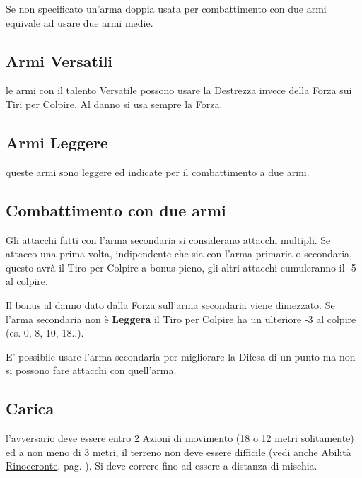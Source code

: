 \begin{multicols}{2}
Se non specificato un'arma doppia usata per combattimento con due armi equivale ad usare due armi medie.

\subsection{Armi Versatili} \label{armiversatili}

le armi con il talento Versatile possono usare la Destrezza invece della Forza sui Tiri per Colpire. Al danno si usa sempre la Forza.

\subsection{Armi Leggere} \label{armileggere}

queste armi sono leggere ed indicate per il \hyperlink{combattimentoaduemani}{combattimento a due armi}.



\subsection{Combattimento con due armi}\hypertarget{combattimentoaduemani}{}\label{combattimentoduemani}

Gli attacchi fatti con l'arma secondaria si considerano attacchi multipli.
Se attacco una prima volta, indipendente che sia con l'arma primaria o secondaria, questo avrà il Tiro per Colpire a bonus pieno, gli altri attacchi cumuleranno il -5 al colpire.

Il bonus al danno dato dalla Forza sull'arma secondaria viene dimezzato. Se l'arma secondaria non è \textbf{Leggera} il Tiro per Colpire ha un ulteriore -3 al colpire (es. 0,-8,-10,-18..).

E' possibile usare l'arma secondaria per migliorare la Difesa di un punto ma non si possono fare attacchi con quell'arma.

\subsection{Carica} \label{carica}\hypertarget{carica}{}

l'avversario deve essere entro 2 Azioni di movimento (18 o 12 metri solitamente) ed a non meno di 3 metri, il terreno non deve essere difficile (vedi anche Abilità \hyperlink{Rinoceronte}{Rinoceronte}, pag. \pageref{Rinoceronte}). Si deve correre fino ad essere a distanza di mischia.


\end{multicols}
